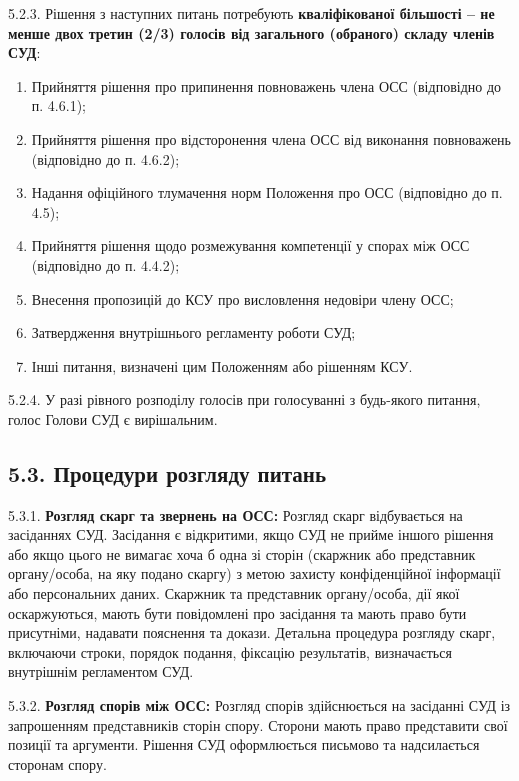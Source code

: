     5.2.3. Рішення з наступних питань потребують \textbf{кваліфікованої більшості – не менше двох третин (2/3) голосів від загального (обраного) складу членів СУД}:

        \begin{enumerate}[label=\alph*)]
            \item Прийняття рішення про припинення повноважень члена ОСС (відповідно до п. 4.6.1);

            \item Прийняття рішення про відсторонення члена ОСС від виконання повноважень (відповідно до п. 4.6.2);

            \item Надання офіційного тлумачення норм Положення про ОСС (відповідно до п. 4.5);

            \item Прийняття рішення щодо розмежування компетенції у спорах між ОСС (відповідно до п. 4.4.2);

            \item Внесення пропозицій до КСУ про висловлення недовіри члену ОСС;
            \item Затвердження внутрішнього регламенту роботи СУД;
            \item Інші питання, визначені цим Положенням або рішенням КСУ.
        \end{enumerate}

    5.2.4. У разі рівного розподілу голосів при голосуванні з будь-якого питання, голос Голови СУД є вирішальним.

\subsection*{5.3. Процедури розгляду питань}
    5.3.1. \textbf{Розгляд скарг та звернень на ОСС:} Розгляд скарг відбувається на засіданнях СУД. Засідання є відкритими, якщо СУД не прийме іншого рішення або якщо цього не вимагає хоча б одна зі сторін (скаржник або представник органу/особа, на яку подано скаргу) з метою захисту конфіденційної інформації або персональних даних. Скаржник та представник органу/особа, дії якої оскаржуються, мають бути повідомлені про засідання та мають право бути присутніми, надавати пояснення та докази. Детальна процедура розгляду скарг, включаючи строки, порядок подання, фіксацію результатів, визначається внутрішнім регламентом СУД.

    5.3.2. \textbf{Розгляд спорів між ОСС:} Розгляд спорів здійснюється на засіданні СУД із запрошенням представників сторін спору. Сторони мають право представити свої позиції та аргументи. Рішення СУД оформлюється письмово та надсилається сторонам спору.


